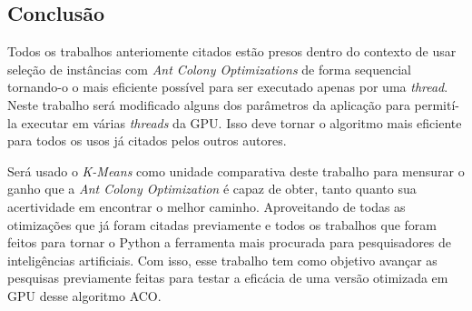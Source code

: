 \subsection{Conclusão}

Todos os trabalhos anteriomente citados estão presos dentro do contexto de usar seleção 
de instâncias com \emph{Ant Colony Optimizations} de forma sequencial tornando-o o mais eficiente 
possível para ser executado apenas por uma \emph{thread}. Neste trabalho será modificado alguns dos 
parâmetros da aplicação para permití-la executar em várias \emph{threads} da GPU. Isso deve tornar 
o algoritmo mais eficiente para todos os usos já citados pelos outros autores.

Será usado o \emph{K-Means} como unidade comparativa deste trabalho para mensurar 
o ganho que a \emph{Ant Colony Optimization} é capaz de obter, tanto quanto sua acertividade
em encontrar o melhor caminho. Aproveitando de todas as otimizações que já foram citadas previamente
e todos os trabalhos que foram feitos para tornar o Python a ferramenta mais procurada
para pesquisadores de inteligências artificiais. Com isso, esse trabalho tem como objetivo
avançar as pesquisas previamente feitas para testar a eficácia de uma versão otimizada em 
GPU desse algoritmo ACO.
